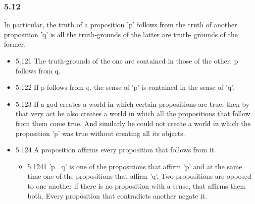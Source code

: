 \documentclass[11pt]{article}
\begin{document}
\subsubsection*{5.12}
\label{sec:orge4d84a5}
In particular, the truth of a proposition 'p' follows from the truth
of another proposition 'q' is all the truth-grounds of the latter are truth-
grounds of the former.
\begin{itemize}
\item 5.121
\label{sec:orge64f5e4}
The truth-grounds of the one are contained in those of the other: p
follows from q.
\item 5.122
\label{sec:orgc739d7e}
If p follows from q, the sense of 'p' is contained in the sense of
'q'.
\item 5.123
\label{sec:org8628c22}
If a god creates a world in which certain propositions are true, then
by that very act he also creates a world in which all the propositions that
follow from them come true. And similarly he could not create a world in
which the proposition 'p' was true without creating all its objects.
\item 5.124
\label{sec:org78165c5}
A proposition affirms every proposition that follows from it.
\begin{itemize}
\item 5.1241
\label{sec:org04d81bf}
'p . q' is one of the propositions that affirm 'p' and at the same
time one of the propositions that affirm 'q'. Two propositions are opposed
to one another if there is no proposition with a sense, that affirms them
both. Every proposition that contradicts another negate it.
\end{itemize}
\end{itemize}
\end{document}
